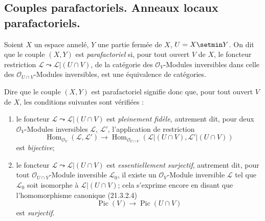 \subsection{Couples parafactoriels. Anneaux locaux parafactoriels.}
\label{IV.21.13}

\begin{definition}[21.13.1]
Soient $X$ un espace annelé, $Y$ une partie fermée de $X$, $U=X\setmin Y$.
On dit que le couple $(X,Y)$ est \emph{parafactoriel} si, pour tout ouvert $V$ de $X$,
le foncteur restriction
$\mathscr L\leadsto\mathscr L|(U\cap V)$, de la catégorie des
$\mathcal O_V$-Modules inversibles dans celle des $\mathcal O_{U\cap V}$-Modules
inversibles, est une équivalence de catégories.
\end{definition}

Dire que le couple $(X,Y)$ est parafactoriel signifie donc que, pour tout ouvert $V$
de $X$, les conditions suivantes sont vérifiées :
\begin{enumerate}[label=\arabic*\textsuperscript{o}]
  \item le foncteur $\mathscr L\leadsto\mathscr L|(U\cap V)$ est \emph{pleinement
  fidèle}, autrement dit, pour deux $\mathcal O_V$-Modules inversibles $\mathscr L$,
  $\mathscr L'$, l'application de restriction
  \[
    \operatorname{Hom}_{\mathcal O_V}(\mathscr L,\mathscr L')
    \longrightarrow
    \operatorname{Hom}_{\mathcal O_{U\cap V}}
    (\mathscr L|(U\cap V),\mathscr L'|(U\cap V))
  \]
  est \emph{bijective};
  \item le foncteur $\mathscr L\leadsto\mathscr L|(U\cap V)$ est
  \emph{essentiellement surjectif}, autrement dit, pour tout
  $\mathcal O_{U\cap V}$-Module inversible $\mathscr L_0$, il existe un
  $\mathcal O_V$-Module inversible $\mathscr L$ tel que $\mathscr L_0$ soit
  isomorphe à $\mathscr L|(U\cap V)$; cela s'exprime encore en disant que
  l'homomorphisme canonique (21.3.2.4)
  \[
    \operatorname{Pic}(V)\longrightarrow\operatorname{Pic}(U\cap V)
  \]
  est \emph{surjectif}.
\end{enumerate}

